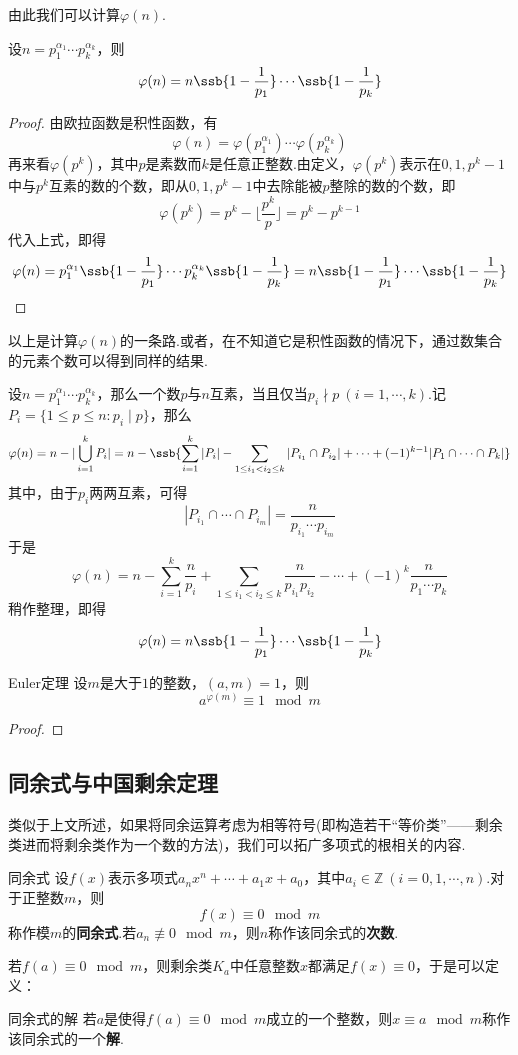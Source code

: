 由此我们可以计算$\varphi (n)$.

\begin{theorem}
	设$n=p_1^{\alpha _1} \cdots p_k^{\alpha _k}$，则$$\varphi (n) = n \ssb{1-\frac{1}{p_1}} \cdots \ssb{1-\frac{1}{p_k}}$$
\end{theorem}
\begin{proof}
	由欧拉函数是积性函数，有$$\varphi (n) = \varphi (p_1^{\alpha _1}) \cdots \varphi (p_k^{\alpha _k})$$
	再来看$\varphi (p^k)$，其中$p$是素数而$k$是任意正整数.由定义，$\varphi (p^k)$表示在$0,1,p^k-1$中与$p^k$互素的数的个数，即从$0,1,p^k-1$中去除能被$p$整除的数的个数，即$$\varphi (p^k) = p^k - \lfloor \frac{p^k}{p} \rfloor = p^k - p^{k-1}$$
	代入上式，即得$$\varphi (n) = p_1^{\alpha _1}\ssb{1-\frac{1}{p_1}} \cdots p_k^{\alpha _k}\ssb{1-\frac{1}{p_k}} = n \ssb{1-\frac{1}{p_1}} \cdots \ssb{1-\frac{1}{p_k}}$$
\end{proof}

以上是计算$\varphi (n)$的一条路.或者，在不知道它是积性函数的情况下，通过数集合的元素个数可以得到同样的结果.

设$n=p_1^{\alpha _1} \cdots p_k^{\alpha _k}$，那么一个数$p$与$n$互素，当且仅当$p_i \nmid p~(i=1,\cdots ,k)$.记$P_i=\{ 1\leq p \leq n: p_i \mid p\}$，那么$$\varphi (n) = n - | \bigcup_{i=1}^{k} P_i | = n- \ssb{\sum_{i=1}^{k} |P_i| - \sum_{1\leq i_1 < i_2 \leq k} |P_{i_1} \cap P_{i_2}| + \cdots + (-1)^{k-1} |P_1 \cap \cdots \cap P_k|  }$$
其中，由于$p_i$两两互素，可得$$|P_{i_1} \cap \cdots \cap P_{i_m}| = \frac{n}{p_{i_1} \cdots p_{i_m}}$$
于是$$\varphi (n) = n - \sum_{i=1}^{k} \frac{n}{p_i}  + \sum_{1\leq i_1 < i_2 \leq k} \frac{n}{p_{i_1}p_{i_2}} - \cdots + (-1)^{k} \frac{n}{p_1 \cdots p_k}$$
稍作整理，即得$$\varphi (n) = n \ssb{1-\frac{1}{p_1}} \cdots \ssb{1-\frac{1}{p_k}}$$

\begin{theorem}{Euler定理}
	设$m$是大于$1$的整数，$(a,m)=1$，则$$a^{\varphi (m)} \equiv 1 \mod m$$
\end{theorem}
\begin{proof}
	
\end{proof}

\subsection{同余式与中国剩余定理}

类似于上文所述，如果将同余运算考虑为相等符号(即构造若干“等价类”——剩余类进而将剩余类作为一个数的方法)，我们可以拓广多项式的根相关的内容.

\begin{definition}{同余式}
	设$f(x)$表示多项式$a_nx^n + \cdots + a_1x + a_0$，其中$a_i \in \mathbb{Z}~(i=0,1,\cdots ,n)$.对于正整数$m$，则$$f(x) \equiv 0 \mod m$$
	称作模$m$的\textbf{同余式}.若$a_n \not\equiv 0 \mod m$，则$n$称作该同余式的\textbf{次数}.
\end{definition}

若$f(a) \equiv 0 \mod m$，则剩余类$K_a$中任意整数$x$都满足$f(x) \equiv 0$，于是可以定义：

\begin{definition}{同余式的解}
	若$a$是使得$f(a) \equiv 0 \mod m$成立的一个整数，则$x \equiv a \mod m$称作该同余式的一个\textbf{解}.
\end{definition}
